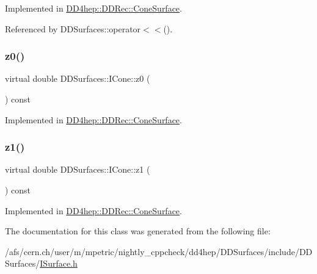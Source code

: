 Implemented in \hyperlink{class_d_d4hep_1_1_d_d_rec_1_1_cone_surface_aab661bae81017ac8df1914910b1e0bb5}{D\+D4hep\+::\+D\+D\+Rec\+::\+Cone\+Surface}.



Referenced by D\+D\+Surfaces\+::operator$<$$<$().

\hypertarget{class_d_d_surfaces_1_1_i_cone_a306dd8443c146ce57ebf98f7f5c11013}{}\label{class_d_d_surfaces_1_1_i_cone_a306dd8443c146ce57ebf98f7f5c11013} 
\subsubsection{\texorpdfstring{z0()}{z0()}}
{\footnotesize\ttfamily virtual double D\+D\+Surfaces\+::\+I\+Cone\+::z0 (\begin{DoxyParamCaption}{ }\end{DoxyParamCaption}) const\hspace{0.3cm}{\ttfamily [pure virtual]}}



Implemented in \hyperlink{class_d_d4hep_1_1_d_d_rec_1_1_cone_surface_a0bb598e6dcf760916f657335a4b34455}{D\+D4hep\+::\+D\+D\+Rec\+::\+Cone\+Surface}.

\hypertarget{class_d_d_surfaces_1_1_i_cone_a7bb86876e5f5196ea11ac78bcaa42dbc}{}\label{class_d_d_surfaces_1_1_i_cone_a7bb86876e5f5196ea11ac78bcaa42dbc} 
\subsubsection{\texorpdfstring{z1()}{z1()}}
{\footnotesize\ttfamily virtual double D\+D\+Surfaces\+::\+I\+Cone\+::z1 (\begin{DoxyParamCaption}{ }\end{DoxyParamCaption}) const\hspace{0.3cm}{\ttfamily [pure virtual]}}



Implemented in \hyperlink{class_d_d4hep_1_1_d_d_rec_1_1_cone_surface_a2928c2663e6d181315172b0e3339abe0}{D\+D4hep\+::\+D\+D\+Rec\+::\+Cone\+Surface}.



The documentation for this class was generated from the following file\+:\begin{DoxyCompactItemize}
\item 
/afs/cern.\+ch/user/m/mpetric/nightly\+\_\+cppcheck/dd4hep/\+D\+D\+Surfaces/include/\+D\+D\+Surfaces/\hyperlink{_i_surface_8h}{I\+Surface.\+h}\end{DoxyCompactItemize}
